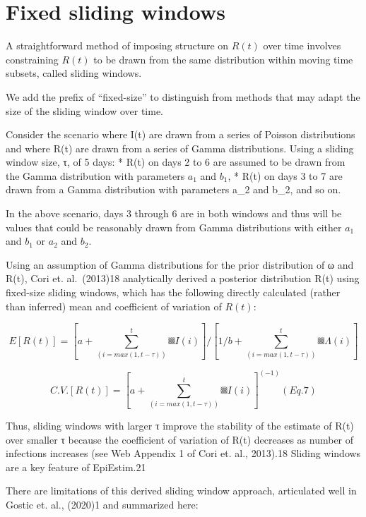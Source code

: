 \documentclass[
  letterpaper,
  DIV=11,
  numbers=noendperiod]{scrreprt}
\begin{document}
\section*{Fixed sliding windows}\label{sec-fixedwindow}


A straightforward method of imposing structure on \(R(t)\) over time
involves constraining \(R(t)\) to be drawn from the same distribution
within moving time subsets, called sliding windows.

We add the prefix of ``fixed-size'' to distinguish from methods that may
adapt the size of the sliding window over time.

Consider the scenario where I(t) are drawn from a series of Poisson
distributions and where R(t) are drawn from a series of Gamma
distributions. Using a sliding window size, τ, of 5 days: * R(t) on days
2 to 6 are assumed to be drawn from the Gamma distribution with
parameters \(a_1\) and \(b_1\), * R(t) on days 3 to 7 are drawn from a
Gamma distribution with parameters a\_2 and b\_2, and so on.

In the above scenario, days 3 through 6 are in both windows and thus
will be values that could be reasonably drawn from Gamma distributions
with either \(a_1\) and \(b_1\) or \(a_2\) and \(b_2\).

Using an assumption of Gamma distributions for the prior distribution of
ω and R(t), Cori et. al.~(2013)18 analytically derived a posterior
distribution R(t) using fixed-size sliding windows, which has the
following directly calculated (rather than inferred) mean and
coefficient of variation of \(R(t)\):

\[
E[R(t)]=[a+ ∑_(i=max⁡(1,   t-τ))^t▒I(i) ]/[1/b+∑_(i=max⁡(1,   t-τ))^t▒Λ(i) ]  
\]

\[
C.V.[R(t)]=[a+ ∑_(i=max⁡(1,   t-τ))^t▒I(i) ]^(-1)               (Eq.7)
\]

Thus, sliding windows with larger τ improve the stability of the
estimate of R(t) over smaller τ because the coefficient of variation of
R(t) decreases as number of infections increases (see Web Appendix 1 of
Cori et. al., 2013).18 Sliding windows are a key feature of EpiEstim.21

There are limitations of this derived sliding window approach,
articulated well in Gostic et. al., (2020)1 and summarized here:
\end{document}
